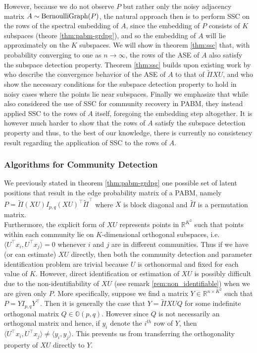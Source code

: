 \documentclass[
  12pt,
]{article}
\theoremstyle{definition}
\theoremstyle{definition}
\theoremstyle{definition}
\theoremstyle{definition}
\theoremstyle{remark}
\begin{document}
However, because we do not observe \(P\) but rather only the noisy
adjacency matrix \(A \sim \mathrm{BernoulliGraph}(P)\), the natural approach then is
to perform SSC on the rows of the spectral embedding of \(A\),
since the embedding of \(P\) consists of \(K\) subspaces (theore \ref{thm:pabm-grdpg}),
and so the embedding of \(A\) will lie approximately on the \(K\) subspaces.
We will show in theorem \ref{thm:ssc} that, with probability converging to
one as \(n \rightarrow \infty\), the rows of the ASE of \(A\) also
satisfy the subspace detection property.
Theorem \ref{thm:ssc} builds upon existing work by
\citet{rubindelanchy2017statistical} who describe the convergence
behavior of the ASE of \(A\) to that of \(\tilde{\Pi} XU\), and
\citet{jmlr-v28-wang13} who show the necessary conditions for the
subspace detection property to hold in noisy cases where the points lie
near subspaces. Finally we emphasize that while
\citet{noroozi2019estimation} also considered the use of SSC for
community recovery in PABM, they instead applied SSC to the rows of
\(A\) itself, foregoing
the embedding step altogether. It is however much harder to show that
the rows of \(A\) satisfy the subspace detection property and thus, to
the best of our knowledge, there is currently no consistency result
regarding the application of SSC to the rows of \(A\).

\hypertarget{algorithms-for-community-detection}{%
\subsubsection{Algorithms for Community Detection}\label{algorithms-for-community-detection}}

We previously stated in theorem \ref{thm:pabm-grdpg} one possible set of latent positions that result in
the edge probability matrix of a PABM, namely
\(P = \tilde{\Pi} (XU) I_{p, q} (XU)^\top \tilde{\Pi}^{\top}\) where \(X\) is block diagonal and
\(\tilde{\Pi}\) is a permutation matrix.\\
Furthermore, the explicit form of \(XU\) represents points in \(\mathbb{R}^{K^2}\)
such that points within each community lie on \(K\)-dimensional
orthogonal subspaces, i.e.~\(\langle U^{\top} x_i, U^{\top} x_j \rangle = 0\) whenever \(i\) and \(j\) are in different communities.
Thus if we have (or can estimate) \(XU\) directly, then both the community
detection and parameter identification problem are trivial because \(U\)
is orthonormal and fixed for each value of \(K\).
However, direct
identification or estimation of \(XU\) is possibly difficult
due to the non-identifiability of \(XU\) (see remark \ref{rem:non_identifiable})
when we are given only \(P\).
More specifically, suppose we find a matrix \(Y \in \mathbb{R}^{n \times K^2}\)
such that \(P = Y I_{p, q} Y^\top\). Then it is generally the case that
\(Y = \tilde{\Pi} XU Q\) for some indefinite orthogonal matrix
\(Q \in \mathbb{O}(p,q)\).
However since \(Q\) is not necessarily an
orthogonal matrix and hence, if \(y_i\) denote the \(i^{th}\) row of \(Y\),
then \(\langle U^{\top} x_i, U^{\top} x_j \rangle \neq \langle y_i, y_j \rangle\).
This prevents us from transferring the orthogonality property of
\(XU\) directly to \(Y\).
\end{document}
